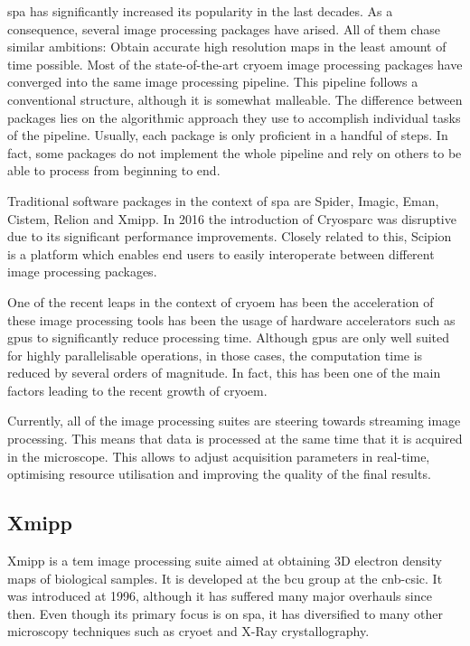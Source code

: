 \documentclass[../main.tex]{subfiles}
\begin{document}
\Gls{spa} has significantly increased its popularity in the last decades. As a consequence, several image processing packages have arised. All of them chase similar ambitions: Obtain accurate high resolution maps in the least amount of time possible. Most of the state-of-the-art \gls{cryoem} image processing packages have converged into the same image processing pipeline. This pipeline follows a conventional structure, although it is somewhat malleable. The difference between packages lies on the algorithmic approach they use to accomplish individual tasks of the pipeline. Usually, each package is only proficient in a handful of steps. In fact, some packages do not implement the whole pipeline and rely on others to be able to process from beginning to end.

Traditional software packages in the context of \gls{spa} are Spider\cite{shaikh2008}, Imagic, Eman\cite{ludke2000}, Cistem\cite{grigorieff2018}, Relion\cite{scheres2021} and Xmipp\cite{sorzano2004}. In 2016 the introduction of Cryosparc\cite{cryosparc} was disruptive due to its significant performance improvements. Closely related to this, Scipion\cite{delarosa2016} is a platform which enables end users to easily interoperate between different image processing packages.

One of the recent leaps in the context of \gls{cryoem} has been the acceleration of these image processing tools has been the usage of hardware accelerators such as \glspl{gpu} to significantly reduce processing time. Although \glspl{gpu} are only well suited for highly parallelisable operations, in those cases, the computation time is reduced by several orders of magnitude. In fact, this has been one of the main factors leading to the recent growth of \gls{cryoem}.

Currently, all of the image processing suites are steering towards streaming image processing. This means that data is processed at the same time that it is acquired in the microscope. This allows to adjust acquisition parameters in real-time, optimising resource utilisation and improving the quality of the final results.

\subsection{Xmipp}
Xmipp is a \gls{tem} image processing suite aimed at obtaining 3D electron density maps of biological samples. It is developed at the \gls{bcu} group at the \gls{cnb}-\gls{csic}. It was introduced at 1996, although it has suffered many major overhauls since then. Even though its primary focus is on \gls{spa}, it has diversified to many other microscopy techniques such as \gls{cryoet} and X-Ray crystallography\cite{sorzano2004}.
\end{document}
